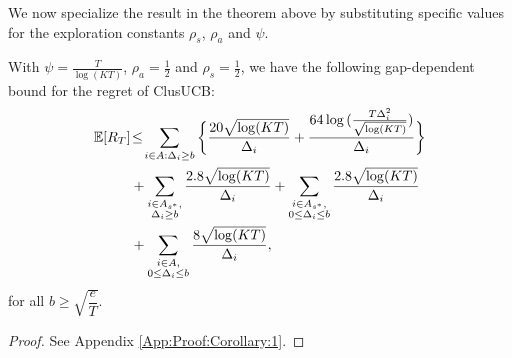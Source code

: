 We now specialize the result in the theorem above by substituting specific values for the exploration constants $\rho_{s}$, $\rho_{a}$ and $\psi$. 

\begin{corollary}
\label{Result:Corollary:1}
With $\psi=\frac{T}{\log (KT)}$, $\rho_{a}=\frac{1}{2}$ and $\rho_{s}=\frac{1}{2}$,  we have the following gap-dependent bound for the regret of ClusUCB:
\begin{align*}
\mathbb{E} [R_T] &\!\le\! \sum_{i\in A:\Delta_{i}\geq b}\bigg\lbrace\dfrac{20\sqrt{\log (KT)}}{\Delta_{i}}  + \dfrac{64\log{(\frac{T\Delta_{i}^{2}}{\sqrt{\log (KT)}})}}{\Delta_{i}}\bigg\rbrace \\
&+ \sum\limits_{\substack{i\in A_{s^{*}},\\ \Delta_{i}\geq b}}\dfrac{2.8\sqrt{\log (KT)}}{\Delta_{i}} + \sum\limits_{\substack{i\in A_{s^{*}},\\0\leq\Delta_{i}\leq b}}\dfrac{2.8\sqrt{\log (KT)}}{\Delta_{i}} \\ 
&+ \sum\limits_{\substack{i\in A,\\0\leq\Delta_{i}\leq b}}\dfrac{8\sqrt{\log (KT)}}{\Delta_{i}} ,
\end{align*} 
 for all $b\geq \sqrt{\dfrac{e}{T}}$.
\end{corollary}
\begin{proof}
 See Appendix \ref{App:Proof:Corollary:1}.
\end{proof}

